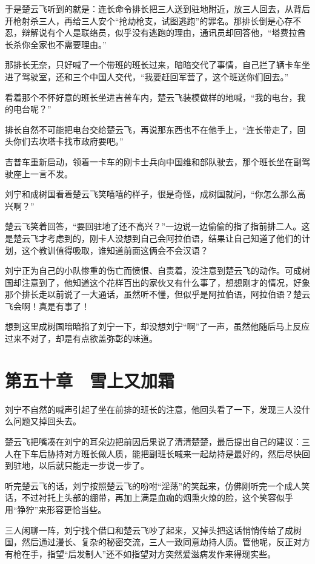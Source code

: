 于是楚云飞听到的就是：连长命令排长把三人送到驻地附近，放三人回去，从背后开枪射杀三人，再给三人安个“抢劫枪支，试图逃跑”的罪名。那排长倒是心存不忍，辩解说有个人是联络员，似乎没有逃跑的理由，通讯员却回答他，“塔费拉酋长杀你全家也不需要理由。”

那排长无奈，只好喊了一个带班的班长过来，暗暗交代了事情，自己拦了辆卡车坐进了驾驶室，还和三个中国人交代，“我要赶回军营了，这个班送你们回去。”

看着那个不怀好意的班长坐进吉普车内，楚云飞装模做样的地喊，“我的电台，我的电台呢？”

排长自然不可能把电台交给楚云飞，再说那东西也不在他手上，“连长带走了，回头你们去坎塔卡找市政府要吧。”

吉普车重新启动，领着一卡车的刚卡士兵向中国维和部队驶去，那个班长坐在副驾驶座上一言不发。

刘宁和成树国看着楚云飞笑嘻嘻的样子，很是奇怪，成树国就问，“你怎么那么高兴啊？”

楚云飞笑着回答，“要回驻地了还不高兴？”一边说一边偷偷的指了指前排二人。这是楚云飞才考虑到的，刚卡人没想到自己会阿拉伯语，结果让自己知道了他们的计划，这个教训值得吸取，谁知道前面这俩会不会汉语？

刘宁正为自己的小队惨重的伤亡而愤恨、自责着，没注意到楚云飞的动作。可成树国却注意到了，他知道这个花样百出的家伙又有什么事了，想想刚才的情况，好象那个排长走以前说了一大通话，虽然听不懂，但似乎是阿拉伯语，阿拉伯语？楚云飞会啊！真是有事了！

想到这里成树国暗暗掐了刘宁一下，却没想刘宁“啊”了一声，虽然他随后马上反应过来不对了，却是有点欲盖弥彰的味道。

\section{第五十章　雪上又加霜}

刘宁不自然的喊声引起了坐在前排的班长的注意，他回头看了一下，发现三人没什么问题又掉回头去。

楚云飞把嘴凑在刘宁的耳朵边把前因后果说了清清楚楚，最后提出自己的建议：三人在下车后胁持对方班长做人质，能把副班长喊来一起劫持是最好的，然后尽快回到驻地，以后就只能走一步说一步了。

听完楚云飞的话，刘宁按照楚云飞的吩咐“淫荡”的笑起来，仿佛刚听完一个成人笑话，不过衬托上头部的绷带，再加上满是血痂的烟熏火燎的脸，这个笑容似乎用“狰狞”来形容更恰当些。

三人闲聊一阵，刘宁找个借口和楚云飞吵了起来，又掉头把这话悄悄传给了成树国，然后通过漫长、复杂的秘密交流，三人一致同意劫持人质。管他呢，反正对方有枪在手，指望“后发制人”还不如指望对方突然爱滋病发作来得现实些。

